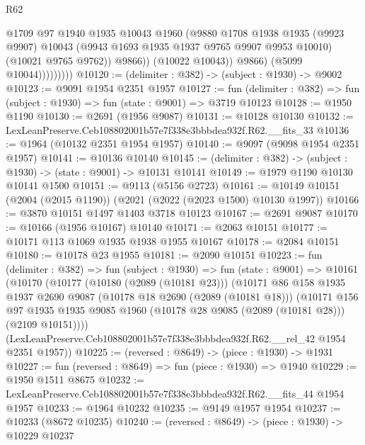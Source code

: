\begin{lexlean}{R62}
\begin{coremodule}
                            @1709
                            @97
                            @1940
                            @1935
                            @10043
                            @1960
                            (@9880
                              @1708
                              @1938
                              @1935
                              (@9923 @9907)
                              @10043
                              (@9943 @1693 @1935 @1937 @9765 @9907 @9953 @10010)
                              (@10021 @9765 @9762))
                            @9866))
                        (@10022 @10043))
                      @9866)
                    (@5099 @10044)))))))))
@10120 := (delimiter : @382) -> (subject : @1930) -> @9002
@10123 := @9091 @1954 @2351 @1957
@10127 := fun (delimiter : @382) => fun (subject : @1930) => fun (state : @9001) => @3719 @10123
@10128 := @1950 @1190
@10130 := @2691 (@1956 @9087)
@10131 := @10128 @10130
@10132 := LexLeanPreserve.Ceb108802001b57e7f338e3bbbdea932f.R62.__fits_33
@10136 := @1964 (@10132 @2351 @1954 @1957)
@10140 := @9097 (@9098 @1954 @2351 @1957)
@10141 := @10136 @10140
@10145 := (delimiter : @382) -> (subject : @1930) -> (state : @9001) -> @10131 @10141
@10149 := @1979 @1190 @10130 @10141 @1500
@10151 := @9113 (@5156 @2723)
@10161 := @10149 @10151 (@2004 (@2015 @1190)) (@2021 (@2022 (@2023 @1500) @10130 @1997))
@10166 := @3870 @10151 @1497 @1403 @3718 @10123
@10167 := @2691 @9087
@10170 := @10166 (@1956 @10167) @10140
@10171 := @2063 @10151
@10177 := @10171 @113 @1069 @1935 @1938 @1955 @10167
@10178 := @2084 @10151
@10180 := @10178 @23 @1955
@10181 := @2090 @10151
@10223 := fun (delimiter : @382) =>
  fun (subject : @1930) =>
  fun (state : @9001) =>
  @10161
    (@10170
      (@10177
        (@10180 (@2089 (@10181 @23)))
        (@10171
          @86
          @158
          @1935
          @1937
          @2690
          @9087
          (@10178 @18 @2690 (@2089 (@10181 @18)))
          (@10171
            @156
            @97
            @1935
            @1935
            @9085
            @1960
            (@10178 @28 @9085 (@2089 (@10181 @28)))
            (@2109 @10151))))
      (LexLeanPreserve.Ceb108802001b57e7f338e3bbbdea932f.R62.__rel_42 @1954 @2351 @1957))
@10225 := (reversed : @8649) -> (piece : @1930) -> @1931
@10227 := fun (reversed : @8649) => fun (piece : @1930) => @1940
@10229 := @1950 @1511 @8675
@10232 := LexLeanPreserve.Ceb108802001b57e7f338e3bbbdea932f.R62.__fits_44 @1954 @1957
@10233 := @1964 @10232
@10235 := @9149 @1957 @1954
@10237 := @10233 (@8672 @10235)
@10240 := (reversed : @8649) -> (piece : @1930) -> @10229 @10237

\end{coremodule}
\end{lexlean}
